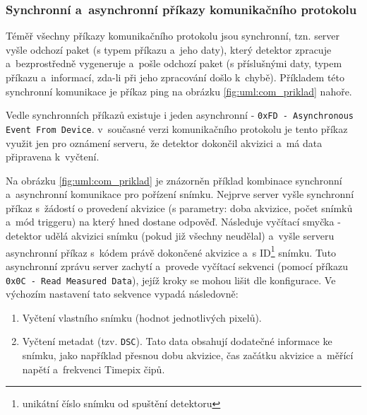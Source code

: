 \subsubsection{Synchronní a~asynchronní příkazy komunikačního protokolu}\label{atlas:com:synchonni_a_asynchonni_prikazy}
Téměř všechny příkazy komunikačního protokolu jsou synchronní, tzn. server vyšle odchozí paket (s typem příkazu a~jeho daty), který detektor zpracuje a~bezprostředně vygeneruje a~pošle odchozí paket (s příslušnými daty, typem příkazu a~informací, zda-li při jeho zpracování došlo k~chybě). Příkladem této synchronní komunikace je příkaz ping na obrázku \ref{fig:uml:com_priklad} nahoře.

Vedle synchronních příkazů existuje i jeden asynchronní - \texttt{0xFD - Asynchronous Event From Device}. v~současné verzi komunikačního protokolu je tento příkaz využit jen pro oznámení serveru, že detektor dokončil akvizici a~má data připravena k~vyčtení.

Na obrázku \ref{fig:uml:com_priklad} je znázorněn příklad kombinace synchronní a~asynchronní komunikace pro pořízení snímku. Nejprve server vyšle synchronní příkaz s~žádostí o provedení akvizice (s parametry: doba akvizice, počet snímků a~mód triggeru) na který hned dostane odpověď. Následuje vyčítací smyčka - detektor udělá akvizici snímku (pokud již všechny neudělal) a~vyšle serveru asynchronní příkaz s~kódem právě dokončené akvizice a~s ID\footnote{unikátní číslo snímku od spuštění detektoru} snímku. Tuto asynchronní zprávu server zachytí a~provede vyčítací sekvenci (pomocí příkazu \texttt{0x0C - Read Measured Data}), jejíž kroky se mohou lišit dle konfigurace. Ve výchozím nastavení tato sekvence vypadá následovně:
\begin{enumerate}
	\item Vyčtení vlastního snímku (hodnot jednotlivých pixelů).
	\item Vyčtení metadat (tzv. \texttt{DSC}). Tato data obsahují dodatečné informace ke snímku, jako například přesnou dobu akvizice, čas začátku akvizice a~měřící napětí a~frekvenci Timepix čipů.
\end{enumerate}

